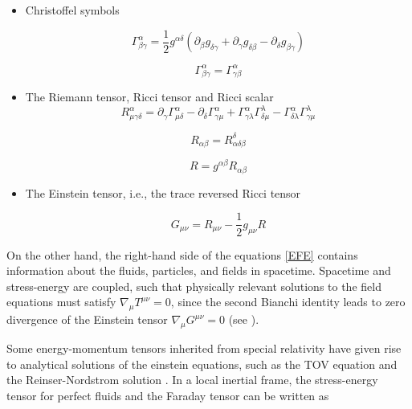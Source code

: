 \begin{itemize}
\item Christoffel symbols

\begin{equation}\label{christoffel}
\Gamma^{\alpha}_{\beta \gamma} = \frac{1}{2} g^{\alpha \delta}(\partial_{\beta} g_{\delta \gamma} + \partial_{\gamma} g_{\delta \beta} - \partial_{\delta} g_{\beta \gamma})
\end{equation}

\begin{equation}
\Gamma^{\alpha}_{\beta \gamma} = \Gamma^{\alpha}_{\gamma \beta}
\end{equation}


\item The Riemann tensor, Ricci tensor and Ricci scalar 
\begin{equation}\label{riemann}
R^{\alpha}_{\mu\gamma \delta} = \partial_{\gamma} \Gamma^{\alpha}_{\mu \delta} - \partial_{\delta} \Gamma^{\alpha}_{\gamma \mu} +  \Gamma^{\alpha}_{\gamma \lambda} \Gamma^{\lambda}_{\delta \mu} - \Gamma^{\alpha}_{\delta \lambda} \Gamma^{\lambda}_{\gamma \mu}
\end{equation}

\begin{equation}
R_{\alpha \beta}= R^{\delta}_{\alpha \delta \beta}
\end{equation}

\begin{equation}
R = g^{\alpha \beta}R_{\alpha \beta}
\end{equation}

\item The Einstein tensor, i.e., the trace reversed Ricci tensor

\begin{equation}
G_{\mu\nu} = R_{\mu\nu} - \frac{1}{2} g_{\mu\nu} R
\end{equation}


\end{itemize}

On the other hand, the right-hand side of the equations \ref{EFE} contains information about the fluids, particles, and fields in spacetime. Spacetime and stress-energy are coupled, such that physically relevant solutions to the field equations must satisfy $\nabla_{\mu} T^{\mu\nu} = 0$, since the second Bianchi identity leads to zero divergence of the Einstein tensor $\nabla_{\mu}G^{\mu\nu} = 0$ (see \cite{inverno, Wald:1984rg, Weinberg:1972kfs}).

Some energy-momentum tensors inherited from special relativity have given rise to analytical solutions of the einstein equations, such as the TOV equation \cite{PhysRev.55.374} and the Reinser-Nordstrom solution \cite{https://doi.org/10.1002/andp.19163550905}. In a local inertial frame, the stress-energy tensor for perfect fluids and the Faraday tensor can be written as


